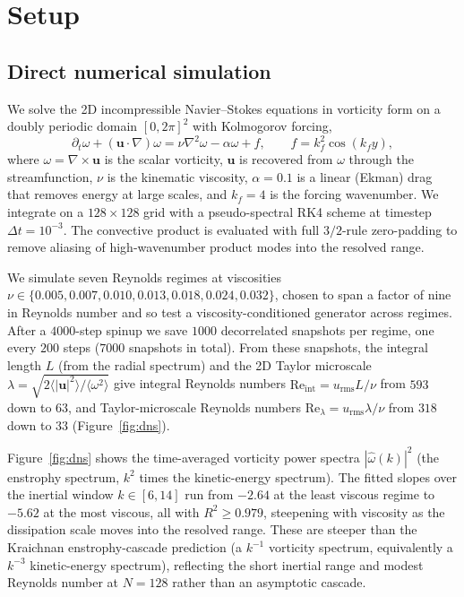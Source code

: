 \documentclass[10pt]{article} %
\begin{document}
\section{Setup}
\label{sec:setup}

\subsection{Direct numerical simulation}

We solve the 2D incompressible Navier--Stokes equations in vorticity form on a doubly periodic domain $[0, 2\pi]^2$ with Kolmogorov forcing,
\begin{equation}
\partial_t \omega + (\mathbf{u} \cdot \nabla) \omega = \nu \nabla^2 \omega - \alpha \omega + f, \qquad f = k_f^2 \cos(k_f y),
\label{eq:ns}
\end{equation}
where $\omega = \nabla \times \mathbf{u}$ is the scalar vorticity, $\mathbf{u}$ is recovered from $\omega$ through the streamfunction, $\nu$ is the kinematic viscosity, $\alpha = 0.1$ is a linear (Ekman) drag that removes energy at large scales, and $k_f = 4$ is the forcing wavenumber. We integrate on a $128 \times 128$ grid with a pseudo-spectral RK4 scheme at timestep $\Delta t = 10^{-3}$. The convective product is evaluated with full $3/2$-rule zero-padding \citep{orszag1971elimination} to remove aliasing of high-wavenumber product modes into the resolved range.

We simulate seven Reynolds regimes at viscosities $\nu \in \{0.005, 0.007, 0.010, 0.013, 0.018, 0.024, 0.032\}$, chosen to span a factor of nine in Reynolds number and so test a viscosity-conditioned generator across regimes. After a $4000$-step spinup we save $1000$ decorrelated snapshots per regime, one every $200$ steps ($7000$ snapshots in total). From these snapshots, the integral length $L$ (from the radial spectrum) and the 2D Taylor microscale $\lambda = \sqrt{2 \langle |\mathbf{u}|^2 \rangle / \langle \omega^2 \rangle}$ give integral Reynolds numbers $\text{Re}_{\text{int}} = u_{\text{rms}} L / \nu$ from $593$ down to $63$, and Taylor-microscale Reynolds numbers $\text{Re}_\lambda = u_{\text{rms}} \lambda / \nu$ from $318$ down to $33$ (Figure~\ref{fig:dns}).

Figure~\ref{fig:dns} shows the time-averaged vorticity power spectra $|\hat{\omega}(k)|^2$ (the enstrophy spectrum, $k^2$ times the kinetic-energy spectrum). The fitted slopes over the inertial window $k \in [6, 14]$ run from $-2.64$ at the least viscous regime to $-5.62$ at the most viscous, all with $R^2 \geq 0.979$, steepening with viscosity as the dissipation scale moves into the resolved range. These are steeper than the Kraichnan enstrophy-cascade prediction \citep{kraichnan1967inertial, boffetta2012two} (a $k^{-1}$ vorticity spectrum, equivalently a $k^{-3}$ kinetic-energy spectrum), reflecting the short inertial range and modest Reynolds number at $N = 128$ rather than an asymptotic cascade.
\end{document}
